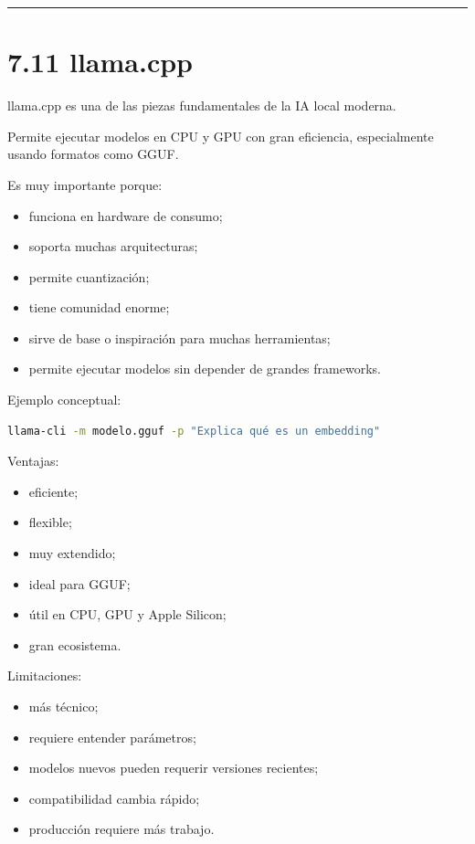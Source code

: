 \begin{center}\rule{0.5\linewidth}{0.5pt}\end{center}

\section{7.11 llama.cpp}\label{llama.cpp}

llama.cpp es una de las piezas fundamentales de la IA local moderna.

Permite ejecutar modelos en CPU y GPU con gran eficiencia, especialmente
usando formatos como GGUF.

Es muy importante porque:

\begin{itemize}
\tightlist
\item
  funciona en hardware de consumo;
\item
  soporta muchas arquitecturas;
\item
  permite cuantización;
\item
  tiene comunidad enorme;
\item
  sirve de base o inspiración para muchas herramientas;
\item
  permite ejecutar modelos sin depender de grandes frameworks.
\end{itemize}

Ejemplo conceptual:

\begin{lstlisting}[language=bash]
llama-cli -m modelo.gguf -p "Explica qué es un embedding"
\end{lstlisting}

Ventajas:

\begin{itemize}
\tightlist
\item
  eficiente;
\item
  flexible;
\item
  muy extendido;
\item
  ideal para GGUF;
\item
  útil en CPU, GPU y Apple Silicon;
\item
  gran ecosistema.
\end{itemize}

Limitaciones:

\begin{itemize}
\tightlist
\item
  más técnico;
\item
  requiere entender parámetros;
\item
  modelos nuevos pueden requerir versiones recientes;
\item
  compatibilidad cambia rápido;
\item
  producción requiere más trabajo.
\end{itemize}

